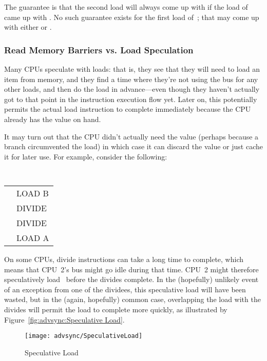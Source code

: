 The guarantee is that the second load will always come up with 
if the
load of~ came up with .
No such guarantee exists for the first load
of~; that may come up with either  or .

\subsubsection{Read Memory Barriers vs. Load Speculation}
\label{sec:advsync:Read Memory Barriers vs. Load Speculation}

Many CPUs speculate with loads: that is, they see that they will need to
load an item from memory, and they find a time where they're not using
the bus for any other loads, and then do the load in advance---even though
they haven't actually got to that point in the instruction execution
flow yet.
Later on, this potentially permits the actual load instruction to
complete immediately because the CPU already has the value on hand.

It may turn out that the CPU didn't actually need the value (perhaps because a
branch circumvented the load) in which case it can discard the value or just
cache it for later use.
For example, consider the following:

\vspace{5pt}
\begin{minipage}[t]{\columnwidth}
\tt
\scriptsize
\begin{tabular}{l|p{1.5in}}
	\nf{CPU 1} &	\nf{CPU 2} \\
	\hline
		&	LOAD B \\
		&	DIVIDE \\
		&	DIVIDE \\
		&	LOAD A \\
\end{tabular}
\end{minipage}
\vspace{5pt}

On some CPUs, divide instructions can take a long time to complete,
which means that CPU~2's bus might go idle during that time.
CPU~2 might therefore speculatively load~ before the divides
complete.
In the (hopefully) unlikely event of an exception from one of the dividees,
this speculative load will have been wasted, but in the (again, hopefully)
common case, overlapping the load with the divides will permit the load
to complete more quickly, as illustrated by
Figure~\ref{fig:advsync:Speculative Load}.

\begin{figure*}[htbp]
\centering
\texttt{[image: advsync/SpeculativeLoad]}
\caption{Speculative Load}
\end{figure*}

